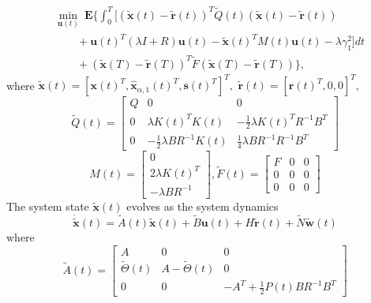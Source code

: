 \documentclass[journal]{IEEEtran}
\begin{document}
 \begin{align}
 &\min_{\mathbf{u}(t)} \ \mathbf{E}\{\int_{0}^{T}{[(\widetilde{\mathbf{x}}(t) - \widetilde{\mathbf{r}}(t))^T\widetilde{Q}(t)(\widetilde{\mathbf{x}}(t) - \widetilde{\mathbf{r}}(t))} \nonumber \\
 &\qquad+ \mathbf{u}(t)^{T}(\lambda I + R)\mathbf{u}(t)  - \widetilde{\mathbf{x}}(t)^TM(t)\mathbf{u}(t) - \lambda \gamma_1^2 ]  dt \nonumber \\
 & \qquad +(\widetilde{\mathbf{x}}(T)-\widetilde{\mathbf{r}}(T))^{T}\widetilde{F}(\widetilde{\mathbf{x}}(T)-\widetilde{\mathbf{r}}(T)) \}, \label{eq:problem-form-dual obj2}
 \end{align}
where 
$\widetilde{\mathbf{x}}(t) = [\mathbf{x}(t)^T, \hat{\mathbf{x}}_{\alpha,1}(t)^T, \mathbf{s}(t)^T]^T,$ $\widetilde{\mathbf{r}}(t) = [\mathbf{r}(t)^T, 0, 0]^T,$
\begin{equation*}
    \widetilde{Q}(t) = 
    \begin{bmatrix}
        Q & 0 & 0 \\
        0 & \lambda K(t)^TK(t) & -\frac{1}{2}\lambda K(t)^TR^{-1}B^T \\
        0 & -\frac{1}{2}\lambda BR^{-1}K(t) & \frac{1}{4}\lambda BR^{-1}R^{-1}B^T
    \end{bmatrix}
\end{equation*}
\begin{equation*}
    M(t) = 
    \begin{bmatrix}
        0 \\
        2\lambda K(t)^T \\
        -\lambda BR^{-1}
    \end{bmatrix},
    \widetilde{F}(t) = 
    \begin{bmatrix}
        F & 0 & 0 \\
        0 & 0 & 0 \\
        0 & 0 & 0
    \end{bmatrix}
\end{equation*}
The system state $\widetilde{\mathbf{x}}(t)$ evolves as the system dynamics
\begin{equation}
    \dot{\widetilde{\mathbf{x}}}(t) = \widetilde{A}(t)\widetilde{\mathbf{x}}(t) + \widetilde{B}\mathbf{u}(t) + H\widetilde{\mathbf{r}}(t) +  \widetilde{N}\widetilde{\mathbf{w}}(t)
\end{equation}
where
\begin{equation*}
    \widetilde{A}(t) = 
    \begin{bmatrix}
        A & 0 & 0 \\
        \widetilde{\Theta}(t) & A-\widetilde{\Theta}(t) & 0 \\
        0 & 0 & -A^T + \frac{1}{2}P(t)BR^{-1}B^T
    \end{bmatrix}
\end{equation*}
\end{document}
